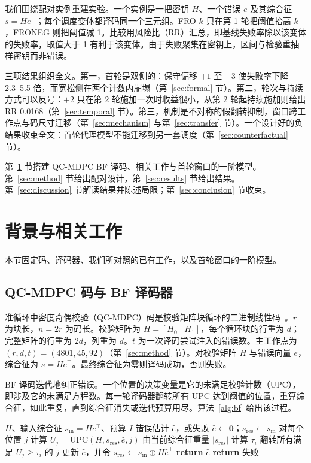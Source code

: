 \documentclass[UTF8,a4paper,10pt,twocolumn]{ctexart}
\begin{document}
我们围绕配对实例重建实验。一个实例是一把密钥 $H$、一个错误 $e$ 及其综合征 $s=He^{\top}$；每个调度变体都译码同一个三元组。FRO-$k$ 只在第 1 轮把阈值抬高 $k$，FRONEG 则把阈值减 1。比较用风险比（RR）汇总，即基线失败率除以该变体的失败率，取值大于 1 有利于该变体。由于失败聚集在密钥上，区间与检验重抽样密钥而非错误。

三项结果组织全文。第一，首轮是双侧的：保守偏移 $+1$ 至 $+3$ 使失败率下降 2.3--5.5 倍，而宽松侧在两个计数内崩塌（第~\ref{sec:formal} 节）。第二，轮次与持续方式可以反号：$+2$ 只在第 2 轮施加一次时收益很小，从第 2 轮起持续施加则给出 RR 0.0168（第~\ref{sec:temporal} 节）。第三，机制是不对称的假翻转抑制，窗口跨工作点与码尺寸迁移（第~\ref{sec:mechanism} 与第~\ref{sec:transfer} 节）。一个设计好的负结果收束全文：首轮代理模型不能迁移到另一套调度（第~\ref{sec:counterfactual} 节）。

第~\ref{sec:background} 节搭建 QC-MDPC BF 译码、相关工作与首轮窗口的一阶模型。第~\ref{sec:method} 节给出配对设计，第~\ref{sec:results} 节给出结果。第~\ref{sec:discussion} 节解读结果并陈述局限；第~\ref{sec:conclusion} 节收束。
\section{背景与相关工作}\label{sec:background}

本节固定码、译码器、我们所对照的已有工作，以及首轮窗口的一阶模型。

\subsection{QC-MDPC 码与 BF 译码器}

准循环中密度奇偶校验（QC-MDPC）码是校验矩阵块循环的二进制线性码~\cite{misoczki2013mdpc}。$r$ 为块长，$n=2r$ 为码长。校验矩阵为 $H=[H_0\mid H_1]$，每个循环块的行重为 $d$；完整矩阵的行重为 $2d$，列重为 $d$。$t$ 为一次译码尝试注入的错误数。主工作点为 $(r,d,t)=(4801,45,92)$（第~\ref{sec:method} 节）。对校验矩阵 $H$ 与错误向量 $e$，综合征为 $s=He^{\top}$。最终综合征为零则译码成功，否则失败。

BF 译码迭代地纠正错误。一个位置的决策变量是它的未满足校验计数（UPC），即涉及它的未满足方程数。每一轮译码器翻转所有 UPC 达到阈值的位置，重算综合征，如此重复，直到综合征消失或迭代预算用尽。算法~\ref{alg:bf} 给出该过程。

\begin{algorithm}[t]
\caption{普通 BF 译码}
\label{alg:bf}
\begin{algorithmic}[1]
\Require $H$、输入综合征 $s_{\mathrm{in}}=He^{\top}$、预算 $I$
\Ensure 错误估计 $\hat e$，或失败
\State $\hat e \gets \mathbf{0}$；$s_{\mathrm{res}} \gets s_{\mathrm{in}}$
  \State 对每个位置 $j$ 计算 $U_j=\mathrm{UPC}(H,s_{\mathrm{res}},\hat e,j)$
  \State 由当前综合征重量 $|s_{\mathrm{res}}|$ 计算 $\tau_i$
  \State 翻转所有满足 $U_j\ge\tau_i$ 的 $j$
  \State 更新 $\hat e$，并令 $s_{\mathrm{res}}\gets s_{\mathrm{in}}\oplus H\hat e^{\top}$
    \State \textbf{return} $\hat e$
  \EndIf
\EndFor
\State \textbf{return} 失败
\end{algorithmic}
\end{algorithm}
\end{document}
